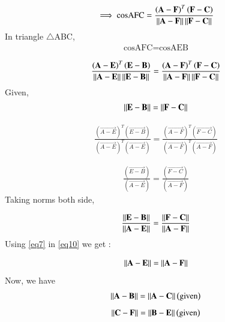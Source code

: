 \documentclass[journal,12pt,twocolumn]{IEEEtran}
\begin{document}
\begin{align}
\implies \text{cosAFC} = \frac{\left( \mathbf{A-F} \right)^T  \left( \mathbf{F - C } \right)}{\left\lVert\mathbf{A - F}\right\rVert \left\lVert\mathbf{F - C}\right\rVert}
\end{align}
 In triangle $\triangle$ABC, 
 \begin{align}
 \text{cosAFC} = \text{cosAEB}
 \end{align}
 
 \begin{align}
\frac{\left( \mathbf{A-E} \right)^T  \left( \mathbf{E - B } \right)}{\left\lVert\mathbf{A - E}\right\rVert \left\lVert\mathbf{E - B}\right\rVert} =  \frac{\left( \mathbf{A-F} \right)^T  \left( \mathbf{F - C } \right)}{\left\lVert\mathbf{A - F}\right\rVert \left\lVert\mathbf{F - C}\right\rVert}
 \end{align}
Given,  
\begin{align}
\left\lVert\mathbf{E - B}\right\rVert = \left\lVert\mathbf{F - C}\right\rVert \label{eq7}
\end{align}


\begin{align}
\frac{ \left( \vec{A-E} \right)^T  \left( \vec{E - B } \right)}{\left ( \vec{A - E} \right )^T \left ( \vec{A - E} \right ) }  =   \frac{ \left( \vec{A-F} \right)^T  \left( \vec{F - C } \right)} { \left ( \vec{A - F}  \right )^T \left ( \vec{A - F} \right ) }
\end{align}

\begin{align}
\frac{ \left( \vec{E - B } \right)}{ \left ( \vec{A - E} \right ) } =  \frac{ \left( \vec{F - C } \right)} { \left ( \vec{A - F} \right ) }
\end{align}
Taking norms both side,
 
\begin{align}
\frac{ \left\lVert \mathbf{E - B }\right\rVert }{ \left\lVert \mathbf{A - E}\right\rVert } =  \frac{ \left\lVert\mathbf{F - C }\right\rVert}{\left\lVert\mathbf{A - F}\right\rVert} \label{eq10}
\end{align}
 Using \ref{eq7} in \ref{eq10} we get :
 
 
 
 \begin{align}
 \left\lVert \mathbf{A - E}\right\rVert =  \left\lVert\mathbf{A - F}\right\rVert \label{eq11}
 \end{align}
 Now, we have
 \begin{align}
   \left\lVert \mathbf{A - B}\right\rVert =  \left\lVert\mathbf{A - C}\right\rVert   \left( \text{given} \right)
 \end{align}
 \begin{align}
  \left\lVert \mathbf{C - F}\right\rVert =  \left\lVert\mathbf{B - E}\right\rVert  \left( \text{given} \right) 
 \end{align}
  
\end{document}
